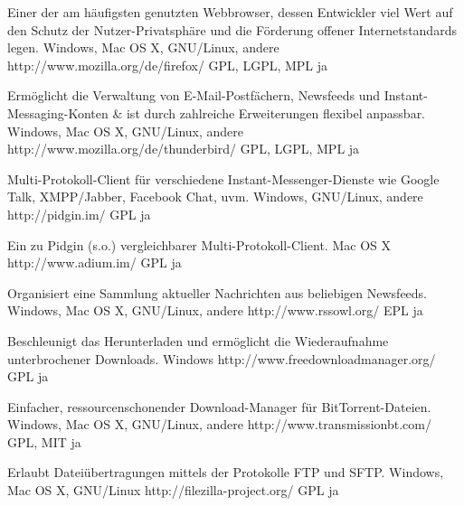 \documentclass[11pt,a4paper,landscape,twocolumn]{article}
\begin{document}


{Einer der am häufigsten genutzten Webbrowser, dessen Entwickler viel Wert auf den Schutz der Nutzer-Privatsphäre und die Förderung offener Internetstandards legen.}
{Windows, Mac OS X, GNU/Linux, andere}
{http://www.mozilla.org/de/firefox/}
{GPL, LGPL, MPL}
{ja}

{Ermöglicht die Verwaltung von E-Mail-Postfächern, Newsfeeds und Instant-Messaging-Konten \& ist durch zahlreiche Erweiterungen flexibel anpassbar.}
{Windows, Mac OS X, GNU/Linux, andere}
{http://www.mozilla.org/de/thunderbird/}
{GPL, LGPL, MPL}
{ja}

{Multi-Protokoll-Client für verschiedene Instant-Messenger-Dienste wie Google Talk, XMPP/Jabber, Facebook Chat, uvm.}
{Windows, GNU/Linux, andere}
{http://pidgin.im/}
{GPL}
{ja}

{Ein zu Pidgin (s.o.) vergleichbarer Multi-Protokoll-Client.}
{Mac OS X}
{http://www.adium.im/}
{GPL}
{ja}


\newpage %


{Organisiert eine Sammlung aktueller Nachrichten aus beliebigen Newsfeeds.}
{Windows, Mac OS X, GNU/Linux, andere}
{http://www.rssowl.org/}
{EPL}
{ja}

\bigskip

{Beschleunigt das Herunterladen und ermöglicht die Wiederaufnahme unterbrochener Downloads.}
{Windows}
{http://www.freedownloadmanager.org/}
{GPL}
{ja}

\bigskip

{Einfacher, ressourcenschonender Download-Manager für BitTorrent-Dateien.}
{Windows, Mac OS X, GNU/Linux, andere}
{http://www.transmissionbt.com/}
{GPL, MIT}
{ja}

{Erlaubt Dateiübertragungen mittels der Protokolle FTP und SFTP.}
{Windows, Mac OS X, GNU/Linux}
{http://filezilla-project.org/}
{GPL}
{ja}
\end{document}

